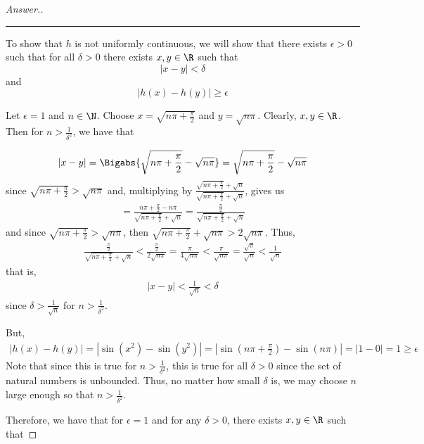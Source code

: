 \documentclass[10pt,twoside]{article}
\begin{document}
\begin{itemize}
\begin{proof}[Answer.]
    \rule{15cm}{1pt}
    
    To show that $h$ is not uniformly continuous, we will show that there exists $\epsilon > 0$ such that for all $\delta>0$ there exists $x,y\in\R$ such that
    \[ |x-y|  <\delta    \]
    and
    \[|h(x) - h(y)| \geq \epsilon\]\smallskip
    
    Let $\epsilon = 1$ and $n\in\N$. Choose $x = \sqrt{n\pi+\frac{\pi}{2}}$ and $y = \sqrt{n\pi}$. Clearly, $x,y\in\R$. Then for $n > \frac{1}{\delta^2}$, we have that
    \iftrue
    \begin{gather*}
        |x-y| = \Bigabs{\sqrt{n\pi+\frac{\pi}{2}} - \sqrt{n\pi}} = \sqrt{n\pi + \frac{\pi}{2}} - \sqrt{n\pi}
    \end{gather*}
    since $\sqrt{n\pi + \frac{\pi}{2}} >  \sqrt{n\pi}$ and, multiplying by $\frac{\sqrt{n\pi + \frac{\pi}{2}} + \sqrt{n}}{\sqrt{n\pi + \frac{\pi}{2}} + \sqrt{n}}$, gives us
    \begin{gather*}
        = \frac{n\pi + \frac{\pi}{2} - n\pi}{\sqrt{n\pi + \frac{\pi}{2}} + \sqrt{n}} = \frac{\frac{\pi}{2}}{\sqrt{n\pi + \frac{\pi}{2}} + \sqrt{n}}
    \end{gather*}
    and since $\sqrt{n\pi + \frac{\pi}{2}} >  \sqrt{n\pi}$, then $\sqrt{n\pi + \frac{\pi}{2}} + \sqrt{n\pi} > 2\sqrt{n\pi}$. Thus,
    \begin{gather*}
        \frac{\frac{\pi}{2}}{\sqrt{n\pi + \frac{\pi}{2}} + \sqrt{n}} < \frac{\frac{\pi}{2}}{2\sqrt{n\pi}} = \frac{\pi}{4\sqrt{n\pi}} < \frac{\pi}{\sqrt{n\pi}} = \frac{\sqrt{\pi}}{\sqrt{n}} < \frac{1}{\sqrt{n}}
    \end{gather*}
    that is, 
    \begin{gather*}
        |x-y| < \frac{1}{\sqrt{n}} < \delta
    \end{gather*}
    since $\delta > \frac{1}{\sqrt{n}}$ for $n> \frac{1}{\delta^2}$.
    \fi 
    But, 
    \begin{gather*}
        |h(x) - h(y)| = |\sin(x^2) - \sin(y^2)| = |\sin(n\pi + \frac{\pi}{2}) - \sin(n\pi)| = |1 - 0| = 1 \geq \epsilon
    \end{gather*}
    Note that since this is true for $n>\frac{1}{\delta^2}$, this is true for all $\delta > 0$ since the set of natural numbers is unbounded. Thus, no matter how small $\delta$ is, we may choose $n$ large enough so that $n>\frac{1}{\delta^2}$.\smallskip
    
    Therefore, we have that for $\epsilon = 1$ and for any $\delta >0$, there exists $x,y\in\R$ such that 
    

\end{proof}
\end{itemize}
\end{document}
